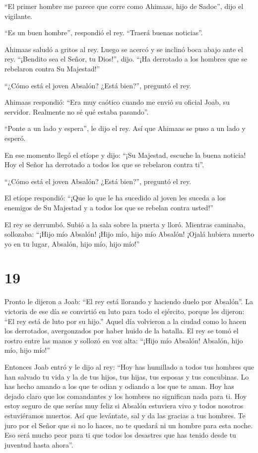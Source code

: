  ``El primer hombre me parece que corre como Ahimaas, hijo
de Sadoc'', dijo el vigilante.

``Es un buen hombre'', respondió el rey. ``Traerá buenas noticias''.

 Ahimaas saludó a gritos al rey. Luego se acercó y se
inclinó boca abajo ante el rey. ``¡Bendito sea el Señor, tu Dios!'',
dijo. ``¡Ha derrotado a los hombres que se rebelaron contra Su
Majestad!''

 ``¿Cómo está el joven Absalón? ¿Está bien?'', preguntó el
rey.

Ahimaas respondió: ``Era muy caótico cuando me envió su oficial Joab, su
servidor. Realmente no sé qué estaba pasando''.

 ``Ponte a un lado y espera'', le dijo el rey. Así que
Ahimaas se puso a un lado y esperó.

 En ese momento llegó el etíope y dijo: ``¡Su Majestad,
escuche la buena noticia! Hoy el Señor ha derrotado a todos los que se
rebelaron contra ti''.

 ``¿Cómo está el joven Absalón? ¿Está bien?'', preguntó el
rey.

El etíope respondió: ``¡Que lo que le ha sucedido al joven les suceda a
los enemigos de Su Majestad y a todos los que se rebelan contra usted!''

 El rey se derrumbó. Subió a la sala sobre la puerta y
lloró. Mientras caminaba, sollozaba: ``¡Hijo mío Absalón! ¡Hijo mío,
hijo mío Absalón! ¡Ojalá hubiera muerto yo en tu lugar, Absalón, hijo
mío, hijo mío!''

\hypertarget{section-18}{%
\section{19}\label{section-18}}

 Pronto le dijeron a Joab: ``El rey está llorando y haciendo
duelo por Absalón''.  La victoria de ese día se convirtió en
luto para todo el ejército, porque les dijeron: ``El rey está de luto
por su hijo.''  Aquel día volvieron a la ciudad como lo
hacen los derrotados, avergonzados por haber huido de la batalla.
 El rey se tomó el rostro entre las manos y sollozó en voz
alta: ``¡Hijo mío Absalón! Absalón, hijo mío, hijo mío!''

 Entonces Joab entró y le dijo al rey: ``Hoy has humillado a
todos tus hombres que han salvado tu vida y la de tus hijos, tus hijas,
tus esposas y tus concubinas.  Lo has hecho amando a los que
te odian y odiando a los que te aman. Hoy has dejado claro que los
comandantes y los hombres no significan nada para ti. Hoy estoy seguro
de que serías muy feliz si Absalón estuviera vivo y todos nosotros
estuviéramos muertos.  Así que levántate, sal y da las
gracias a tus hombres. Te juro por el Señor que si no lo haces, no te
quedará ni un hombre para esta noche. Eso será mucho peor para ti que
todos los desastres que has tenido desde tu juventud hasta ahora''.

